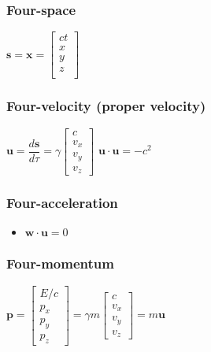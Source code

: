 \subsubsection{Four-space}			
\begin{itemize}
\itemt \(\mathbf{s} = \mathbf{x} = 
\begin{bmatrix}
ct \\
x \\
y \\
z \\
\end{bmatrix}
\)
\end{itemize}

\subsubsection{Four-velocity (proper velocity)}			
\begin{itemize}
\itemt \(\textbf{u} = \dfrac{d\textbf{s}}{d\tau} = \gamma 
\begin{bmatrix} 
c \\
v_x\\
v_y\\
v_z
\end{bmatrix}\)
\itemt \( \textbf{u}\cdot\textbf{u} = -c^2  \)
\end{itemize}

\subsubsection{Four-acceleration}			
\begin{itemize}
\itemt \(\textbf{w} = \dfrac{d\textbf{u}}{d\tau} = \gamma 
\begin{bmatrix} 
c \\
v_x\\
v_y\\
v_z
\end{bmatrix}\)
\item \( \textbf{w}\cdot\textbf{u} = 0 \)
\end{itemize}

\subsubsection{Four-momentum}			
\begin{itemize}
\itemt \(\textbf{p} = 
\begin{bmatrix} 
E/c \\
p_x\\
p_y\\
p_z
\end{bmatrix} = \gamma m
\begin{bmatrix} 
c \\
v_x\\
v_y\\
v_z
\end{bmatrix} = m\textbf{u}\)
\end{itemize}	
                
